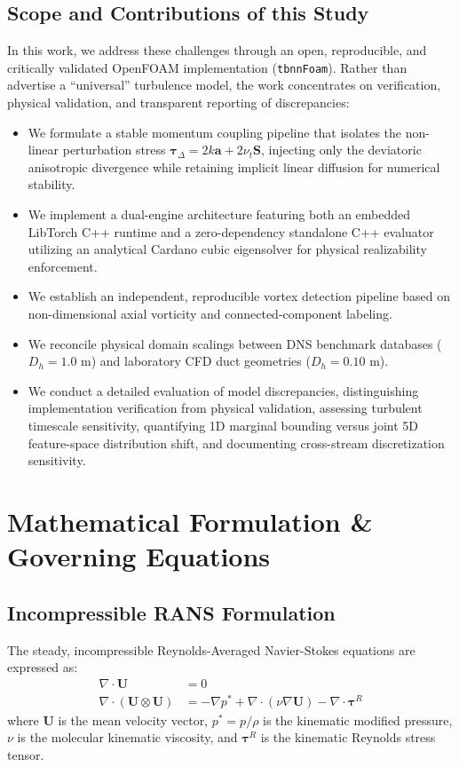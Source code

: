 \documentclass[11pt,a4paper]{article}
\begin{document}
\subsection{Scope and Contributions of this Study}
In this work, we address these challenges through an open, reproducible, and critically validated OpenFOAM implementation (\texttt{tbnnFoam}). Rather than advertise a ``universal'' turbulence model, the work concentrates on verification, physical validation, and transparent reporting of discrepancies:
\begin{itemize}
    \item We formulate a stable momentum coupling pipeline that isolates the non-linear perturbation stress $\boldsymbol{\tau}_\Delta = 2k\mathbf{a} + 2\nu_t \mathbf{S}$, injecting only the deviatoric anisotropic divergence while retaining implicit linear diffusion for numerical stability.
    \item We implement a dual-engine architecture featuring both an embedded LibTorch C++ runtime and a zero-dependency standalone C++ evaluator utilizing an analytical Cardano cubic eigensolver for physical realizability enforcement.
    \item We establish an independent, reproducible vortex detection pipeline based on non-dimensional axial vorticity and connected-component labeling.
    \item We reconcile physical domain scalings between DNS benchmark databases ($D_h = 1.0\text{ m}$) and laboratory CFD duct geometries ($D_h = 0.10\text{ m}$).
    \item We conduct a detailed evaluation of model discrepancies, distinguishing implementation verification from physical validation, assessing turbulent timescale sensitivity, quantifying 1D marginal bounding versus joint 5D feature-space distribution shift, and documenting cross-stream discretization sensitivity.
\end{itemize}

\section{Mathematical Formulation \& Governing Equations}

\subsection{Incompressible RANS Formulation}
The steady, incompressible Reynolds-Averaged Navier-Stokes equations are expressed as:
\begin{align}
\nabla \cdot \mathbf{U} &= 0 \\
\nabla \cdot (\mathbf{U} \otimes \mathbf{U}) &= -\nabla p^* + \nabla \cdot (\nu \nabla \mathbf{U}) - \nabla \cdot \boldsymbol{\tau}^R
\end{align}
where $\mathbf{U}$ is the mean velocity vector, $p^* = p/\rho$ is the kinematic modified pressure, $\nu$ is the molecular kinematic viscosity, and $\boldsymbol{\tau}^R$ is the kinematic Reynolds stress tensor.
\end{document}
